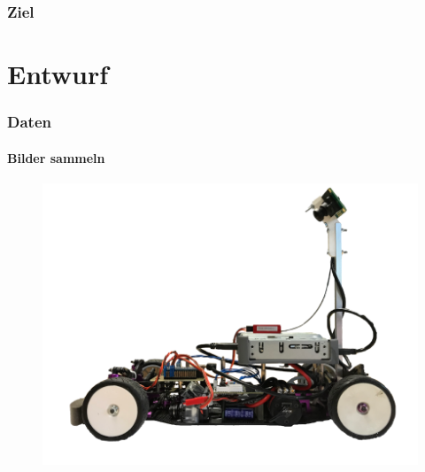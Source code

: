 \documentclass{beamer}
\begin{document}
\begin{frame}
\frametitle{Ziel}

\end{frame}


\section{Entwurf}
\frame{\tableofcontents[currentsection]}

\begin{frame}
\frametitle{Daten}
\framesubtitle{Bilder sammeln}

\begin{figure}
	\centering
	\includegraphics[width=0.4\linewidth]{figures/Fahrzeug.png}	 
	\label{img:fahrzeug}
\end{figure}


\end{frame}
\end{document}
